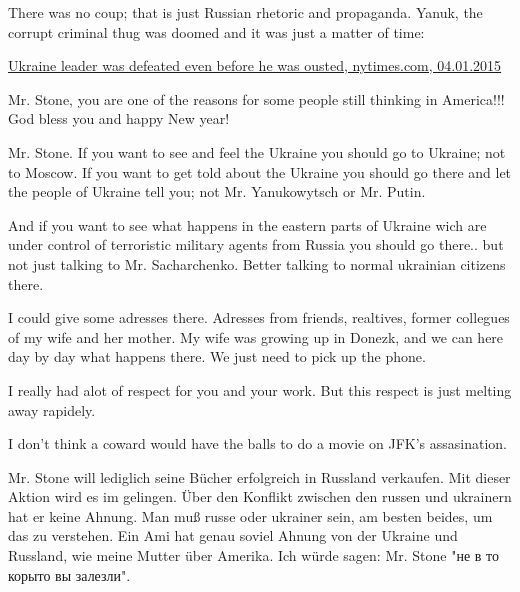 \begin{itemize}
\begin{itemize}

There was no coup; that is just Russian rhetoric and propaganda. Yanuk, the
corrupt criminal thug was doomed and it was just a matter of time:

\href{https://www.nytimes.com/2015/01/04/world/europe/ukraine-leader-was-defeated-even-before-he-was-ousted.html}{%
Ukraine leader was defeated even before he was ousted, nytimes.com, 04.01.2015%
}

\end{itemize} %


Mr. Stone, you are one of the reasons for some people still thinking in
America!!! God bless you and happy New year!


Mr. Stone. If you want to see and feel the Ukraine you should go to Ukraine;
not to Moscow. If you want to get told about the Ukraine you should go there
and let the people of Ukraine tell you; not Mr. Yanukowytsch or Mr. Putin.

And if you want to see what happens in the eastern parts of Ukraine wich are
under control of terroristic military agents from Russia you should go there..
but not just talking to Mr. Sacharchenko. Better talking to normal ukrainian
citizens there.

I could give some adresses there. Adresses from friends, realtives, former
collegues of my wife and her mother. My wife was growing up in Donezk, and we
can here day by day what happens there. We just need to pick up the phone.

I really had alot of respect for you and your work. But this respect is just
melting away rapidely.

\begin{itemize} %
I don't think a coward would have the balls to do a movie on JFK's assasination.


Mr. Stone will lediglich seine Bücher erfolgreich in Russland verkaufen. Mit
dieser Aktion wird es im gelingen. Über den Konflikt zwischen den russen und
ukrainern hat er keine Ahnung. Man muß russe oder ukrainer sein, am besten
beides, um das zu verstehen. Ein Ami hat genau soviel Ahnung von der Ukraine
und Russland, wie meine Mutter über Amerika. Ich würde sagen: Mr. Stone "не в
то корыто вы залезли".



\end{itemize}
\end{itemize}
